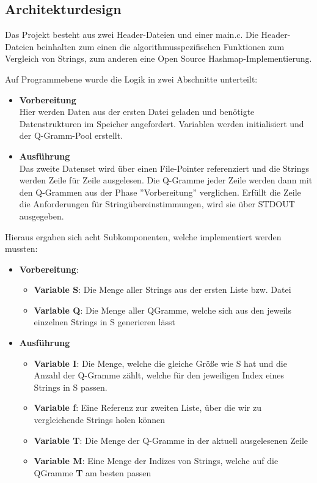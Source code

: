 \clearpage
\subsection{Architekturdesign}

Das Projekt besteht aus zwei Header-Dateien und einer main.c. Die Header-Dateien
beinhalten zum einen die algorithmusspezifischen Funktionen zum Vergleich von
Strings, zum anderen eine Open Source Hashmap-Implementierung.

Auf Programmebene wurde die Logik in zwei Abschnitte unterteilt:
\begin{itemize}
    \item \textbf{Vorbereitung} \\
    Hier werden Daten aus der ersten Datei geladen und benötigte Datenstrukturen im Speicher angefordert.
    Variablen werden initialisiert und der Q-Gramm-Pool erstellt.
    \item \textbf{Ausführung} \\
    Das zweite Datenset wird über einen File-Pointer referenziert und die
    Strings werden Zeile für Zeile ausgelesen. Die Q-Gramme jeder Zeile werden dann mit den Q-Grammen aus der Phase ''Vorbereitung'' verglichen. Erfüllt die Zeile die Anforderungen für Stringübereinstimmungen, wird sie über STDOUT ausgegeben.
\end{itemize}

Hieraus ergaben sich acht Subkomponenten, welche implementiert werden mussten:


\begin{itemize}
    \item \textbf{Vorbereitung}:
    \begin{itemize}
        \item \textbf{Variable S}: Die Menge aller Strings aus der ersten Liste bzw. Datei
        \item \textbf{Variable Q}: Die Menge aller QGramme, welche sich aus den jeweils einzelnen Strings in S generieren lässt
    \end{itemize}

    \item \textbf{Ausführung}
    \begin{itemize}
        \item \textbf{Variable I}: Die Menge, welche die gleiche Größe wie S hat und die
        Anzahl der Q-Gramme zählt, welche für den jeweiligen Index eines Strings in
        S passen.
        \item \textbf{Variable f}: Eine Referenz zur zweiten Liste, über die wir zu vergleichende Strings holen können
        \item \textbf{Variable T}: Die Menge der Q-Gramme in der aktuell ausgelesenen Zeile
        \item \textbf{Variable M}: Eine Menge der Indizes von Strings, welche auf die QGramme \textbf{T} am besten passen
    \end{itemize}
\end{itemize}

